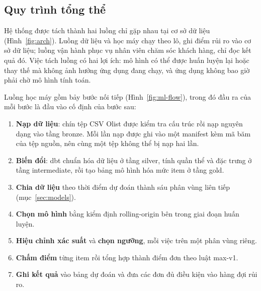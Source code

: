 \subsection{Quy trình tổng thể}

Hệ thống được tách thành hai luồng chỉ gặp nhau tại cơ sở dữ liệu (Hình~\ref{fig:arch}). Luồng dữ liệu và học máy chạy theo lô, ghi điểm rủi ro vào cơ sở dữ liệu; luồng vận hành phục vụ nhân viên chăm sóc khách hàng, chỉ đọc kết quả đó. Việc tách luồng có hai lợi ích: mô hình có thể được huấn luyện lại hoặc thay thế mà không ảnh hưởng ứng dụng đang chạy, và ứng dụng không bao giờ phải chờ mô hình tính toán.

Luồng học máy gồm bảy bước nối tiếp (Hình~\ref{fig:ml-flow}), trong đó đầu ra của mỗi bước là đầu vào cố định của bước sau:
\begin{enumerate}
  \item \textbf{Nạp dữ liệu}: chín tệp CSV Olist được kiểm tra cấu trúc rồi nạp nguyên dạng vào tầng bronze. Mỗi lần nạp được ghi vào một manifest kèm mã băm của tệp nguồn, nên cùng một tệp không thể bị nạp hai lần.
  \item \textbf{Biến đổi}: dbt chuẩn hóa dữ liệu ở tầng silver, tính quần thể và đặc trưng ở tầng intermediate, rồi tạo bảng mô hình hóa mức item ở tầng gold.
  \item \textbf{Chia dữ liệu} theo thời điểm dự đoán thành sáu phân vùng liên tiếp (mục~\ref{sec:models}).
  \item \textbf{Chọn mô hình} bằng kiểm định rolling-origin bên trong giai đoạn huấn luyện.
  \item \textbf{Hiệu chỉnh xác suất} và \textbf{chọn ngưỡng}, mỗi việc trên một phân vùng riêng.
  \item \textbf{Chấm điểm} từng item rồi tổng hợp thành điểm đơn theo luật max-v1.
  \item \textbf{Ghi kết quả} vào bảng dự đoán và đưa các đơn đủ điều kiện vào hàng đợi rủi ro.
\end{enumerate}

